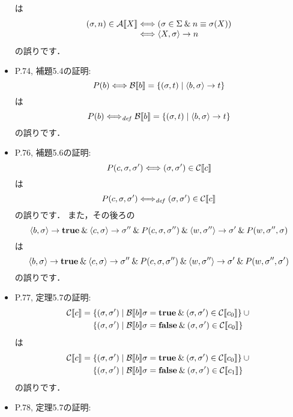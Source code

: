 \documentclass[12pt,titlepage,twoside,openright,dvipdfmx]{jsbook}
\theoremstyle{definition}
\begin{document}
\begin{itemize}
\[  \]
  は
  \[
    \begin{array}{l@{}l}
      (\sigma, n)\in\denotation{A}{X}
      & {} \Longleftrightarrow (\sigma\in\Sigma\AND n\equiv \sigma(X)) \\
      & {} \Longleftrightarrow \tuple{X,\sigma}\rightarrow n
    \end{array}
  \]
  の誤りです．
\item P.74, 補題5.4の証明:
    \[
      P(b)\Longleftrightarrow
      \mathcal{B}\llbracket{b}\rrbracket=\{ (\sigma,t) \mid   \langle{b,\sigma}\rangle\rightarrow t\}
    \]
    は
    \[
      P(b)\Longleftrightarrow_{\mathit{def}}
      \mathcal{B}\llbracket{b}\rrbracket=\{ (\sigma,t) \mid   \langle{b,\sigma}\rangle\rightarrow t\}
    \]
    の誤りです．
  \item P.76, 補題5.6の証明:
    \[
      P(c,\sigma,\sigma')
      \Longleftrightarrow
      (\sigma,\sigma')\in\mathcal{C}\llbracket{c}\rrbracket
    \]
    は
    \[
      P(c,\sigma,\sigma')
      \Longleftrightarrow_{\mathit{def}}
      (\sigma,\sigma')\in\mathcal{C}\llbracket{c}\rrbracket
    \]
    の誤りです．
    また，その後ろの
    \[
      \langle{b,\sigma}\rangle\rightarrow\mathbf{true}\mathbin{\&}
      \langle{c,\sigma}\rangle\rightarrow\sigma''\mathbin{\&}
      P(c,\sigma,\sigma'') \mathbin{\&}
      \langle{w,\sigma''}\rangle\rightarrow\sigma'\mathbin{\&}
      P(w,\sigma'',\sigma)
    \]
    は
    \[
      \langle{b,\sigma}\rangle\rightarrow\mathbf{true}\mathbin{\&}
      \langle{c,\sigma}\rangle\rightarrow\sigma''\mathbin{\&}
      P(c,\sigma,\sigma'') \mathbin{\&}
      \langle{w,\sigma''}\rangle\rightarrow\sigma'\mathbin{\&}
      P(w,\sigma'',\sigma')
    \]
    の誤りです．
  \item P.77, 定理5.7の証明:
    \begin{align*}
      \mathcal{C}\llbracket{c}\rrbracket = {}
      & \{(\sigma,\sigma')\mid  \mathcal{B}\llbracket{b}\rrbracket\sigma=\mathbf{true}\mathbin{\&}
        (\sigma,\sigma')\in\mathcal{C}\llbracket{c_0}\rrbracket\}\cup {} \\
      & \{(\sigma,\sigma')\mid  \mathcal{B}\llbracket{b}\rrbracket\sigma=\mathbf{false}\mathbin{\&}
        (\sigma,\sigma')\in\mathcal{C}\llbracket{c_0}\rrbracket\}  
    \end{align*}
    は
    \begin{align*}
      \mathcal{C}\llbracket{c}\rrbracket = {}
      & \{(\sigma,\sigma')\mid  \mathcal{B}\llbracket{b}\rrbracket\sigma=\mathbf{true}\mathbin{\&}
        (\sigma,\sigma')\in\mathcal{C}\llbracket{c_0}\rrbracket\}\cup {} \\
      & \{(\sigma,\sigma')\mid  \mathcal{B}\llbracket{b}\rrbracket\sigma=\mathbf{false}\mathbin{\&}
        (\sigma,\sigma')\in\mathcal{C}\llbracket{c_1}\rrbracket\}  
    \end{align*}
    の誤りです．
  \item P.78, 定理5.7の証明:
    \begin{align*}

\end{align*}
\end{itemize}
\end{document}
